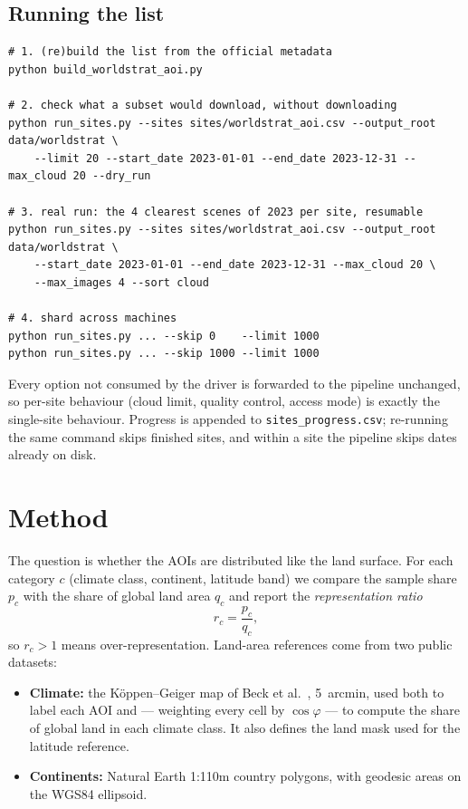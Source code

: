 \documentclass[11pt,a4paper]{article}
\begin{document}
\subsection{Running the list}

\begin{verbatim}
# 1. (re)build the list from the official metadata
python build_worldstrat_aoi.py

# 2. check what a subset would download, without downloading
python run_sites.py --sites sites/worldstrat_aoi.csv --output_root data/worldstrat \
    --limit 20 --start_date 2023-01-01 --end_date 2023-12-31 --max_cloud 20 --dry_run

# 3. real run: the 4 clearest scenes of 2023 per site, resumable
python run_sites.py --sites sites/worldstrat_aoi.csv --output_root data/worldstrat \
    --start_date 2023-01-01 --end_date 2023-12-31 --max_cloud 20 \
    --max_images 4 --sort cloud

# 4. shard across machines
python run_sites.py ... --skip 0    --limit 1000
python run_sites.py ... --skip 1000 --limit 1000
\end{verbatim}

Every option not consumed by the driver is forwarded to the pipeline unchanged, so per-site
behaviour (cloud limit, quality control, access mode) is exactly the single-site behaviour.
Progress is appended to \texttt{sites\_progress.csv}; re-running the same command skips
finished sites, and within a site the pipeline skips dates already on disk.

\section{Method}
\label{sec:method}

The question is whether the AOIs are distributed like the land surface. For each category $c$
(climate class, continent, latitude band) we compare the sample share $p_c$ with the share of
global land area $q_c$ and report the \emph{representation ratio}
\begin{equation}
  r_c = \frac{p_c}{q_c},
\end{equation}
so $r_c>1$ means over-representation. Land-area references come from two public datasets:

\begin{itemize}
  \item \textbf{Climate:} the Köppen--Geiger map of Beck et al.\ \cite{koppen}, 5~arcmin, used
        both to label each AOI and --- weighting every cell by $\cos\varphi$ --- to compute the
        share of global land in each climate class. It also defines the land mask used for the
        latitude reference.
  \item \textbf{Continents:} Natural Earth 1:110m country polygons, with geodesic areas on the
        WGS84 ellipsoid.
\end{itemize}
\end{document}
